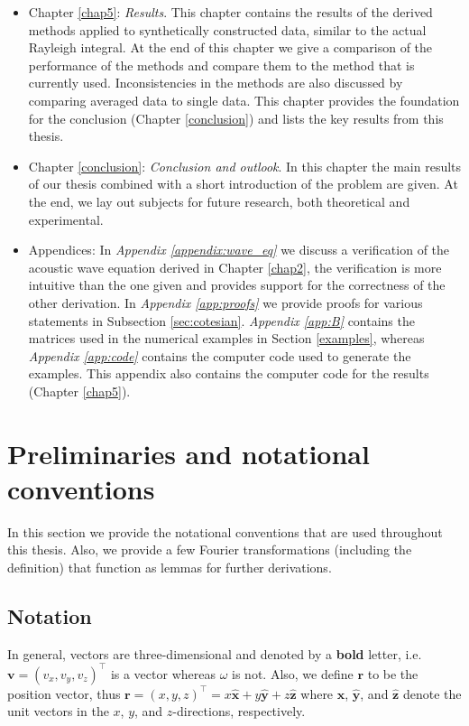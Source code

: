 \begin{itemize}
    \item Chapter \ref{chap5}: \textsl{Results}. This chapter contains the results of the derived methods applied to synthetically constructed data, similar to the actual Rayleigh integral. At the end of this chapter we give a comparison of the performance of the methods and compare them to the method that is currently used. Inconsistencies in the methods are also discussed by comparing averaged data to single data. This chapter provides the foundation for the conclusion (Chapter \ref{conclusion}) and lists the key results from this thesis.
    \item Chapter \ref{conclusion}: \textsl{Conclusion and outlook}. In this chapter the main results of our thesis combined with a short introduction of the problem are given. At the end, we lay out subjects for future research, both theoretical and experimental.
    \item Appendices: In \textsl{Appendix \ref{appendix:wave_eq}} we discuss a verification of the acoustic wave equation derived in Chapter \ref{chap2}, the verification is more intuitive than the one given and provides support for the correctness of the other derivation. In \textsl{Appendix \ref{app:proofs}} we provide proofs for various statements in Subsection \ref{sec:cotesian}. \textsl{Appendix \ref{app:B}} contains the matrices used in the numerical examples in Section \ref{examples}, whereas \textsl{Appendix \ref{app:code}} contains the computer code used to generate the examples. This appendix also contains the computer code for the results (Chapter \ref{chap5}).
\end{itemize}

\section{Preliminaries and notational conventions}
In this section we provide the notational conventions that are used throughout this thesis.
Also, we provide a few Fourier transformations (including the definition) that function as lemmas for further derivations.

\subsection*{Notation}
In general, vectors are three-dimensional and denoted by a \textbf{bold} letter, i.e. $\mathbf v = (v_x, v_y, v_z)^\top$ is a vector whereas $\omega$ is not.
Also, we define $\mathbf r$ to be the position vector, thus $\mathbf r = (x, y, z)^\top = x\mathbf{\hat x} + y\mathbf {\hat y} + z\mathbf{\hat z}$ where $\mathbf{\hat x}$, $\mathbf{\hat y}$, and $\mathbf{\hat z}$ denote the unit vectors in the $x$, $y$, and $z$-directions, respectively.


